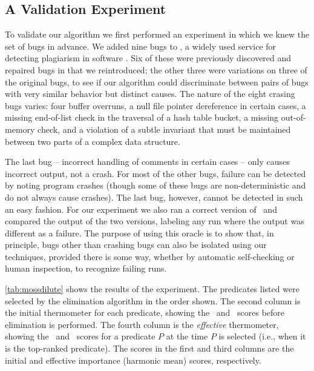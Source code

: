 \subsection{A Validation Experiment}

To validate our algorithm we first performed an experiment in which we
knew the set of bugs in advance.  We added nine bugs to \moss, a
widely used service for detecting plagiarism in software
\cite{Schleimer:2003:WLA}.  Six of these were previously discovered
and repaired bugs in \moss that we reintroduced; the other three were
variations on three of the original bugs, to see if our algorithm could
discriminate between pairs of bugs with very similar behavior but
distinct causes.  The nature of the eight crasing bugs varies: four
buffer overruns, a null file pointer dereference in certain cases, a
missing end-of-list check in the traversal of a hash table bucket, a missing
out-of-memory check, and a violation of a subtle invariant that must be maintained between two
parts of a complex data structure.  

The last bug -- incorrect handling of comments in certain cases -- only
causes incorrect output, not a crash.  For most of the other bugs, failure can 
be detected by noting program crashes (though some of these bugs are non-deterministic 
and do not always cause crashes).  The last bug, however, cannot be detected 
in such an easy fashion.
For our experiment we also ran a correct version of \moss\ and
compared the output of the two versions, labeling any run where the
output was different as a failure.  The purpose of using this oracle
is to show that, in principle, bugs other than crashing bugs can also
be isolated using our techniques, provided there is some way, whether
by automatic self-checking or human inspection, to recognize failing
runs.



\autoref{tab:mossdilute} shows the results of the experiment.  The
predicates listed were selected by the elimination algorithm in the
order shown.  The second column is the initial thermometer for each
predicate,  showing the \context\ and \increase\ scores before
elimination is performed. The fourth column is the {\em effective}
thermometer, showing the \context\ and \increase\ scores for a
predicate $P$ at the time $P$ is selected (i.e., when it is the
top-ranked predicate).  The scores in the first and third columns are
the initial and effective importance (harmonic mean) scores, respectively.

